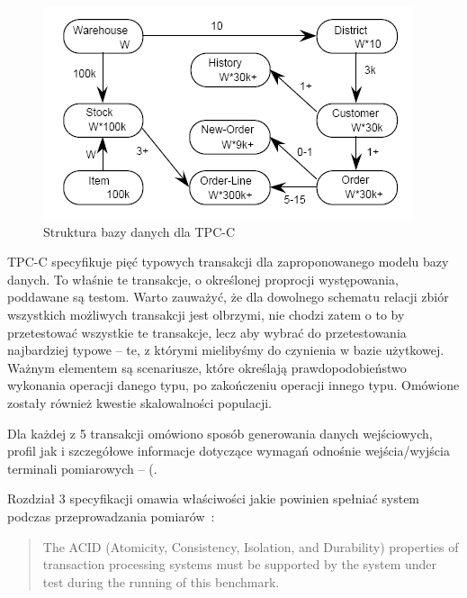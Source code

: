 \begin{figure}[p]
\begin{center}
\includegraphics[width=\linewidth]{figures/tpc/tpc_db_structure2.png}
\end{center}
\caption{Struktura bazy danych dla TPC-C~\cite{TPC1}}\label{rys:tpc_db_structure2}
\end{figure}
\afterpage{\clearpage} %

TPC-C specyfikuje pięć typowych transakcji dla zaproponowanego modelu bazy danych.
To właśnie te transakcje, o określonej proprocji występowania, poddawane są testom. 
Warto zauważyć, że dla dowolnego schematu relacji zbiór wszystkich możliwych transakcji jest olbrzymi,
nie chodzi zatem o to by przetestować wszystkie te transakcje, lecz aby wybrać
do przetestowania najbardziej typowe -- te, z którymi mielibyśmy do czynienia
w bazie użytkowej. Ważnym elementem są scenariusze, które określają prawdopodobieństwo
wykonania operacji danego typu, po zakończeniu operacji innego typu. Omówione zostały również 
kwestie skalowalności populacji.

Dla każdej z 5 transakcji omówiono sposób generowania danych wejściowych,
profil jak i szczegółowe informacje dotyczące wymagań odnośnie wejścia/wyjścia 
terminali pomiarowych --  (.

Rozdział 3 specyfikacji omawia właściwości jakie powinien spełniać system
podczas przeprowadzania pomiarów~\cite{TPC2}:

\begin{quote}
The ACID (Atomicity, Consistency, Isolation, and Durability) properties of 
transaction processing systems must be supported by the system under test 
during the running of this benchmark.
\end{quote}

